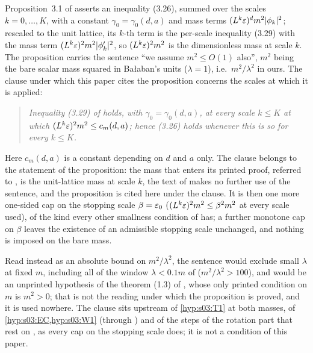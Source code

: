 \begin{remark}\label{rem:s14:BALm}
Proposition~3.1 of \cite{Ba2} asserts an inequality (3.26), summed over the scales $k=0,\dots,K$, with a constant $\gamma_0=\gamma_0(d,a)$ and mass terms $(L^k\varepsilon)^dm^2|\phi_k|^2$; rescaled to the unit lattice, its $k$-th term is the per-scale inequality (3.29) with the mass term $(L^k\varepsilon)^2m^2|\phi'_k|^2$, so $(L^k\varepsilon)^2m^2$ is the dimensionless mass at scale $k$. The proposition carries the sentence ``we assume $m^2\le O(1)$ also'', $m^2$ being the bare scalar mass squared in Ba{\l}aban's units ($\lambda=1$), i.e.\ $m^2/\lambda^2$ in ours. The clause under which this paper cites the proposition concerns the scales at which it is applied:
\begin{quote}
\emph{Inequality (3.29) of \cite{Ba2} holds, with $\gamma_0=\gamma_0(d,a)$, at every scale $k\le K$ at which $(L^k\varepsilon)^2m^2\le c_m(d,a)$; hence (3.26) holds whenever this is so for every $k\le K$.}
\end{quote}
Here $c_m(d,a)$ is a constant depending on $d$ and $a$ only. The clause belongs to the statement of the proposition: the mass that enters its printed proof, referred to \cite[Sect.~4]{Ba4}, is the unit-lattice mass at scale $k$, the text of \cite{Ba2} makes no further use of the sentence, and the proposition is cited here under the clause. It is then one more one-sided cap on the stopping scale $\beta=\varepsilon_0$ ($(L^k\varepsilon)^2m^2\le\beta^2m^2$ at every scale used), of the kind every other smallness condition of \cite{Ba1,Ba2,Ba3,Ba4} has; a further monotone cap on $\beta$ leaves the existence of an admissible stopping scale unchanged, and nothing is imposed on the bare mass.

Read instead as an absolute bound on $m^2/\lambda^2$, the sentence would exclude small $\lambda$ at fixed $m$, including all of the window $\lambda<0.1m$ of \cite{SymPhase} ($m^2/\lambda^2>100$), and would be an unprinted hypothesis of the theorem (1.3) of \cite{Ba2}, whose only printed condition on $m$ is $m^2>0$; that is not the reading under which the proposition is proved, and it is used nowhere. The clause sits upstream of \cref{hyp:s03:T1} at both masses, of \cref{hyp:s03:EC,hyp:s03:W1} (through \cite[Thm.~3.1]{K1}) and of the steps of the rotation part that rest on \cite{Ba1,Ba2}, as every cap on the stopping scale does; it is not a condition of this paper.
\end{remark}

